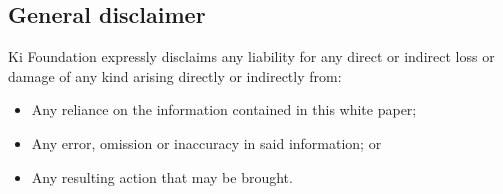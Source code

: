 \subsection{General disclaimer}
Ki Foundation expressly disclaims any liability for any direct or indirect loss or damage of any kind arising directly or indirectly from:
\begin{itemize}
    \item Any reliance on the information contained in this white paper;
    \item Any error, omission or inaccuracy in said information; or
    \item Any resulting action that may be brought.
\end{itemize}

\pagebreak
\clearpage




